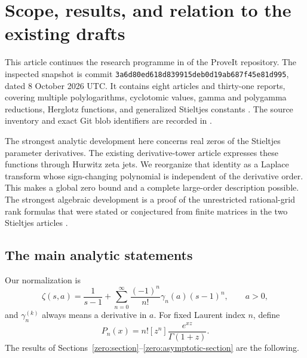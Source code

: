 \section{Scope, results, and relation to the existing drafts}
\label{intro:section}

This article continues the research programme in
 of the ProveIt repository.
The inspected snapshot is commit
\texttt{3a6d80ed618d839915deb0d19ab687f45e81d995},
dated 8 October 2026 UTC.  It contains eight articles and thirty-one
reports, covering multiple polylogarithms, cyclotomic values, gamma and
polygamma reductions, Herglotz functions, and generalized Stieltjes
constants \cite{RepoSnapshot}.  The source inventory and exact Git blob
identifiers are recorded in .

The strongest analytic development here concerns real zeros of the
Stieltjes parameter derivatives.  The existing derivative-tower article
\cite{DraftTower} expresses these functions through Hurwitz zeta jets.
We reorganize that identity as a Laplace transform whose sign-changing
polynomial is independent of the derivative order.  This makes a global
zero bound and a complete large-order description possible.
The strongest algebraic development is a proof of the unrestricted
rational-grid rank formulas that were stated or conjectured from finite
matrices in the two Stieltjes articles \cite{DraftTower,DraftLadder}.

\subsection{The main analytic statements}

Our normalization is
\begin{equation}\label{intro:stieltjes}
 \zeta(s,a)=\frac1{s-1}
       +\sum_{n=0}^{\infty}\frac{(-1)^n}{n!}\gamma_n(a)(s-1)^n,
 \qquad a>0,
\end{equation}
and $\gamma_n^{(k)}$ always means a derivative in $a$.
For fixed Laurent index $n$, define
\[
 P_n(x)=n![z^n]\frac{e^{xz}}{\Gamma(1+z)}.
\]
The results of Sections~\ref{zero:section}--\ref{zero:asymptotic-section}
are the following.

